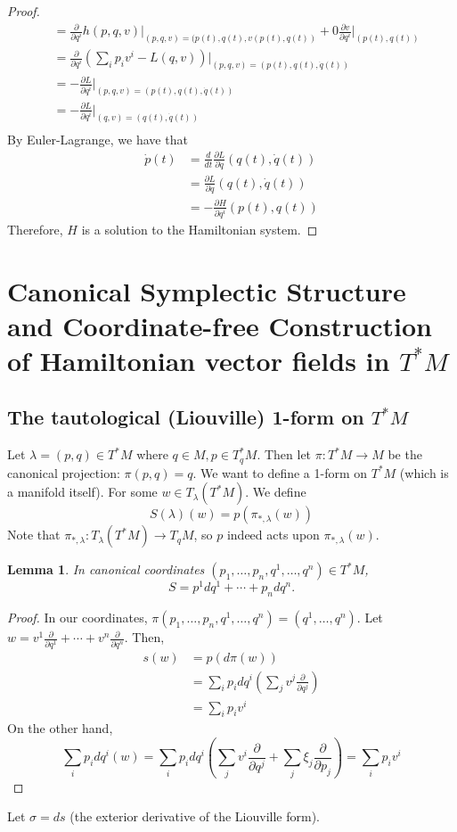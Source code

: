 \documentclass{article}
\newcommand{\pd}[1]{\frac{\partial}{\partial #1}}
\newcommand{\pdof}[2]{\frac{\partial #1}{\partial #2}}
\newtheorem{lm}{Lemma}
\begin{document}
\begin{proof}
\begin{align*}
        &=\pd{q^i} h(p,q,v)\big|_{(p,q,v) = (p(t),q(t), v(p(t),q(t))}+ 0\pdof{v}{q^i}\big|_{(p(t),q(t))}\\
        &=\pd{q^i} \left(\sum_i p_iv^i - L(q,v)\right)\big|_{(p,q,v) = (p(t),q(t), \dot q(t))}\\
        &=-\pdof{L}{q^i}\big|_{(p,q,v) = (p(t),q(t),\dot q(t))}\\
        &=-\pdof{L}{q^i}\big|_{(q,v) = (q(t), \dot q(t))}\\
    \end{align*}
    By Euler-Lagrange, we have that 
    \begin{align*}
        \dot p(t) &= \frac{d}{dt}\pdof{L}{\dot q}(q(t),\dot q(t))\\
        &=\pdof{L}{q}(q(t),\dot q(t))\\
        &=-\pdof{H}{q^i}(p(t),q(t))
    \end{align*}
    Therefore, $H$ is a solution to the Hamiltonian system.
\end{proof}
\section{Canonical Symplectic Structure and Coordinate-free Construction of Hamiltonian vector fields in $T^*M$}
\subsection{The tautological (Liouville) 1-form on $T^*M$}
Let $\lambda = (p,q)\in T^*M$ where $q\in M, p\in T^*_qM$. Then let $\pi:T^*M\to M$ be the canonical projection: $\pi(p,q) = q$. We want to define a 1-form on $T^*M$ (which is a manifold itself). For some $w\in T_\lambda(T^*M)$. We define
\[S(\lambda)(w) = p(\pi_{*,\lambda}(w))\]
Note that $\pi_{*,\lambda}:T_\lambda(T^*M)\to T_qM$, so $p$ indeed acts upon $\pi_{*,\lambda}(w)$.
\begin{lm}
    In canonical coordinates $(p_1,\dots, p_n,q^1,\dots,q^n)\in T^*M$,
    \[S = p^1dq^1+\cdots + p_ndq^n.\]
\end{lm}
\begin{proof}
    In our coordinates, $\pi(p_1,\dots,p_n,q^1,\dots, q^n) = (q^1,\dots,q^n)$. Let $w=v^1\pd{q^1}+\cdots+v^n\pd{q^n}$. Then, 
    \begin{align*}
        s(w) &= p(d\pi(w))\\
        &=\sum_i p_idq^i\left(\sum_jv^j\pd{q^j}\right) \\
        &= \sum_i p_iv^i
    \end{align*}
    On the other hand,
    \[\sum_i p_idq^i(w) = \sum_{i}p_idq^i\left(\sum_j v^i\pd{q^j} + \sum_j \xi_j\pd{p_j}\right) = \sum_i p_iv^i\]
\end{proof}
Let $\sigma = ds$ (the exterior derivative of the Liouville form).
\end{document}
